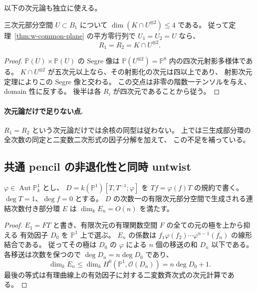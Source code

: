 以下の次元論も独立に使える。

\begin{lemma}[同一支持の場合に確定すること]
\label{lem:w-equal-support}
三次元部分空間 $U\subset B_1$ について
$\dim(K\cap U^{\otimes2})\le4$ である。
従って定理~\ref{thm:w-common-plane} の平方零行列で $U_1=U_2=U$ なら、
\[
 R_1=R_2=K\cap U^{\otimes2}.
\]
\end{lemma}
\begin{proof}
$\mathbb P(U)\times\mathbb P(U)$ の Segre 像は
$\mathbb P(U^{\otimes2})=\mathbb P^8$ 内の四次元射影多様体である。
$K\cap U^{\otimes2}$ が五次元以上なら、その射影化の次元は四以上であり、
射影次元定理によりこの Segre 像と交わる。
この交点は非零の階数一テンソルを与え、domain 性に反する。
後半は各 $R_i$ が四次元であることから従う。
\end{proof}

\paragraph{次元論だけで足りない点.}
$R_1=R_2$ という次元論だけでは余核の同型は従わない。
上では三生成部分環の全次数の同定と二変数二次形式の因子分解を加えて、
この不足を補っている。

\subsection{共通 pencil の非退化性と同時 untwist}
\label{sec:w-simultaneous-untwist}

\begin{lemma}[有理曲線の斉次商環における成長]
\label{lem:w-rational-growth}
$\varphi\in\operatorname{Aut}\mathbb P^1_k$ とし、
$D=k(\mathbb P^1)[T,T^{-1};\varphi]$ を $Tf=\varphi(f)T$ の規約で書く。
$\deg T=1$、$\deg f=0$ とする。
$D$ の次数一の有限次元部分空間で生成される連結次数付き部分環 $E$ は
$\dim_k E_n=O(n)$ を満たす。
\end{lemma}
\begin{proof}
$E_1=FT$ と書き、有限次元の有理関数空間 $F$ の全ての元の極を上から抑える
有効因子 $D_0$ を $\mathbb P^1$ 上で選ぶ。
$E_n$ の係数は $f_1\varphi(f_2)\cdots\varphi^{n-1}(f_n)$ の線形結合である。
従ってその極は $D_0$ の $\varphi$ による $n$ 個の移送の和 $D_n$ 以下である。
各移送は次数を保つので $\deg D_n=n\deg D_0$ であり、
\[
 \dim_k E_n\le \dim_k H^0(\mathbb P^1,\mathcal O(D_n))
 =n\deg D_0+1.
\]
最後の等式は有理曲線上の有効因子に対する二変数斉次式の次元計算である。
\end{proof}

